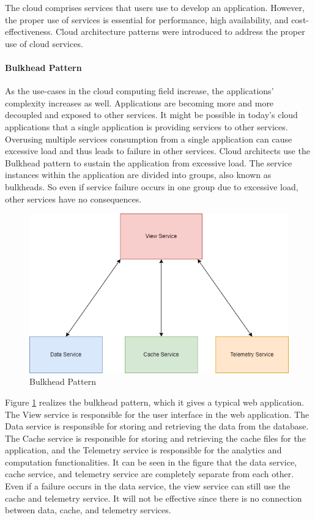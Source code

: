 \documentclass[12pt,a4paper]{article}
\begin{document}
The cloud comprises services that users use to develop an application. However, the proper use of services is essential for performance, high availability, and cost-effectiveness. Cloud architecture patterns were introduced to address the proper use of cloud services.

\paragraph{Bulkhead Pattern}

As the use-cases in the cloud computing field increase, the applications' complexity increases as well. Applications are becoming more and more decoupled and exposed to other services. It might be possible in today's cloud applications that a single application is providing services to other services. Overusing multiple services consumption from a single application can cause excessive load and thus leads to failure in other services. Cloud architects use the Bulkhead pattern to sustain the application from excessive load. The service instances within the application are divided into groups, also known as bulkheads. So even if service failure occurs in one group due to excessive load, other services have no consequences. \cite{r25} 

\begin{figure}[H]
\centering
\includegraphics[scale=0.5]{Bulkhead_pattern.PNG}
\caption{Bulkhead Pattern \cite{r26}}
\label{bulkhead}
\end{figure}

Figure \ref{bulkhead} realizes the bulkhead pattern, which it gives a typical web application. The View service is responsible for the user interface in the web application. The Data service is responsible for storing and retrieving the data from the database. The Cache service is responsible for storing and retrieving the cache files for the application, and the Telemetry service is responsible for the analytics and computation functionalities. It can be seen in the figure that the data service, cache service, and telemetry service are completely separate from each other. Even if a failure occurs in the data service, the view service can still use the cache and telemetry service. It will not be effective since there is no connection between data, cache, and telemetry services. \cite{r26} \\
\end{document}
